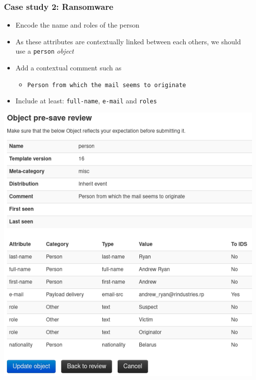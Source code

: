 \begin{frame}
    \frametitle{Case study 2: Ransomware}
    \begin{itemize}
        \item Encode the name and roles of the person
        \item As these attributes are contextually linked between each others, we should use a \texttt{person} \textit{object}
        \item Add a contextual comment such as
        \begin{itemize}
            \item \texttt{Person from which the mail seems to originate}
        \end{itemize}
        \item Include at least: \texttt{full-name}, \texttt{e-mail} and \texttt{roles}
    \end{itemize}
    \begin{center}
        \includegraphics[width=0.42\linewidth]{pictures/case2/object-person.png}
    \end{center}
\end{frame}

